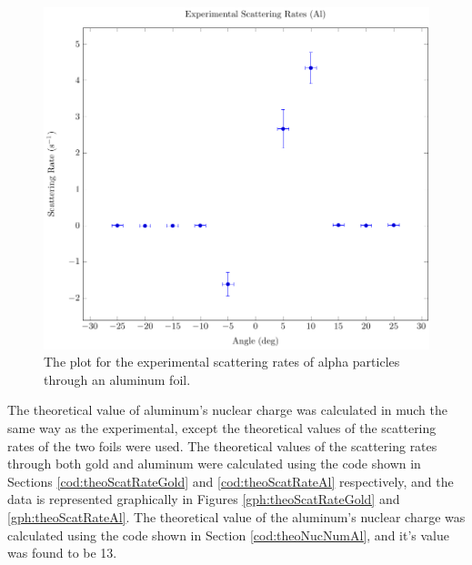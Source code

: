 \documentclass[a4paper]{article}
\begin{document}
\begin{figure}[H]
  \begin{center}
    \includegraphics[scale=0.8]{Plots/ExperimentalScatteringRatesAl/expScatRatesAl.pdf}
  \end{center}
  \caption{The plot for the experimental scattering rates of alpha particles
    through an aluminum foil.}
  \label{gph:expScatRatesAl}
\end{figure}

\qq 

\qq The theoretical value of aluminum's nuclear charge was calculated in much
the same way as the experimental, except the theoretical values of the
scattering rates of the two foils were used. The theoretical values of the
scattering rates through both gold and aluminum were calculated using the code
shown in Sections \ref{cod:theoScatRateGold} and \ref{cod:theoScatRateAl}
respectively, and the data is represented graphically in Figures
\ref{gph:theoScatRateGold} and \ref{gph:theoScatRateAl}. The theoretical value
of the aluminum's nuclear charge was calculated using the code shown in Section
\ref{cod:theoNucNumAl}, and it's value was found to be 13.
\end{document}
